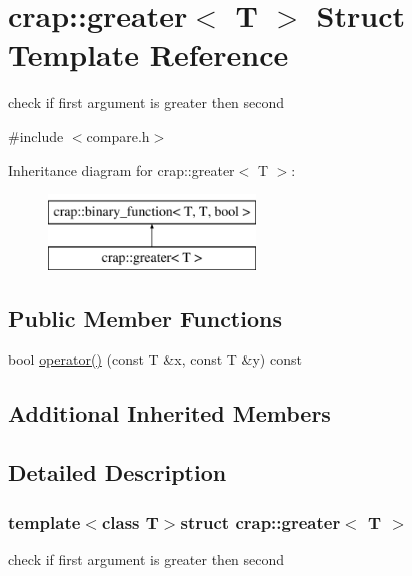 \hypertarget{structcrap_1_1greater}{\section{crap\-:\-:greater$<$ T $>$ Struct Template Reference}
\label{structcrap_1_1greater}
}


check if first argument is greater then second  




{\ttfamily \#include $<$compare.\-h$>$}

Inheritance diagram for crap\-:\-:greater$<$ T $>$\-:\begin{figure}[H]
\begin{center}
\leavevmode
\includegraphics[height=2.000000cm]{structcrap_1_1greater}
\end{center}
\end{figure}
\subsection*{Public Member Functions}
\begin{DoxyCompactItemize}
\item 
bool \hyperlink{structcrap_1_1greater_aa32ef17b3cb751cedc71aeae6c067903}{operator()} (const T \&x, const T \&y) const 
\end{DoxyCompactItemize}
\subsection*{Additional Inherited Members}


\subsection{Detailed Description}
\subsubsection*{template$<$class T$>$struct crap\-::greater$<$ T $>$}

check if first argument is greater then second 

